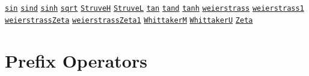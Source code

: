\begin{list}{}
\hyperlink{operator:SIN}{\texttt{sin}}
\hyperlink{operator:SIND}{\texttt{sind}}
\hyperlink{operator:SINH}{\texttt{sinh}}
\hyperlink{operator:SQRT}{\texttt{sqrt}}
\hyperlink{operator:STRUVEH}{\texttt{StruveH}}
\hyperlink{operator:STRUVEL}{\texttt{StruveL}}
\hyperlink{operator:TAN}{\texttt{tan}}
\hyperlink{operator:TAND}{\texttt{tand}}
\hyperlink{operator:TANH}{\texttt{tanh}}
\hyperlink{operator:WEIERSTRASS}{\texttt{weierstrass}}
\hyperlink{operator:WEIERSTRASS1}{\texttt{weierstrass1}}
\hyperlink{operator:WEIERSTRASSZETA}{\texttt{weierstrassZeta}}
\hyperlink{operator:WEIERSTRASSZETA1}{\texttt{weierstrassZeta1}}
\hyperlink{operator:WHITTAKERM}{\texttt{WhittakerM}}
\hyperlink{operator:WHITTAKERU}{\texttt{WhittakerU}}
\hyperlink{operator:ZETA}{\texttt{Zeta}}
\halfinterwordspace

\section{Prefix Operators}


\end{list}
